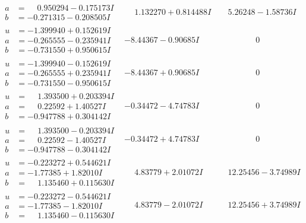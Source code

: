 \documentclass[1p]{elsarticle_modified}
\theoremstyle{definition}
\begin{document}
$$\begin{array}{c|c|c}
\begin{aligned}
a &= \phantom{-}0.950294 - 0.175173 I \\
b &= -0.271315 - 0.208505 I\end{aligned}
 & \phantom{-}1.132270 + 0.814488 I & \phantom{-}5.26248 - 1.58736 I \\ \hline\begin{aligned}
u &= -1.399940 + 0.152619 I \\
a &= -0.265555 - 0.235941 I \\
b &= -0.731550 + 0.950615 I\end{aligned}
 & -8.44367 - 0.90685 I & \phantom{-0.000000 } 0 \\ \hline\begin{aligned}
u &= -1.399940 - 0.152619 I \\
a &= -0.265555 + 0.235941 I \\
b &= -0.731550 - 0.950615 I\end{aligned}
 & -8.44367 + 0.90685 I & \phantom{-0.000000 } 0 \\ \hline\begin{aligned}
u &= \phantom{-}1.393500 + 0.203394 I \\
a &= \phantom{-}0.22592 + 1.40527 I \\
b &= -0.947788 + 0.304142 I\end{aligned}
 & -0.34472 - 4.74783 I & \phantom{-0.000000 } 0 \\ \hline\begin{aligned}
u &= \phantom{-}1.393500 - 0.203394 I \\
a &= \phantom{-}0.22592 - 1.40527 I \\
b &= -0.947788 - 0.304142 I\end{aligned}
 & -0.34472 + 4.74783 I & \phantom{-0.000000 } 0 \\ \hline\begin{aligned}
u &= -0.223272 + 0.544621 I \\
a &= -1.77385 + 1.82010 I \\
b &= \phantom{-}1.135460 + 0.115630 I\end{aligned}
 & \phantom{-}4.83779 + 2.01072 I & \phantom{-}12.25456 - 3.74989 I \\ \hline\begin{aligned}
u &= -0.223272 - 0.544621 I \\
a &= -1.77385 - 1.82010 I \\
b &= \phantom{-}1.135460 - 0.115630 I\end{aligned}
 & \phantom{-}4.83779 - 2.01072 I & \phantom{-}12.25456 + 3.74989 I \\ \hline\begin{aligned}

\end{aligned}
\end{array}$$
\end{document}
